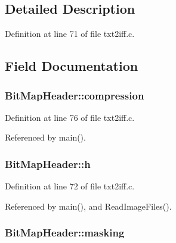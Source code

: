\subsection{Detailed Description}


Definition at line 71 of file txt2iff.\+c.



\subsection{Field Documentation}
\hypertarget{structBitMapHeader_a92825e3c952c151ee3f81630ced3e298}{
\subsubsection[{compression}]{ Bit\+Map\+Header\+::compression}}\label{structBitMapHeader_a92825e3c952c151ee3f81630ced3e298}


Definition at line 76 of file txt2iff.\+c.



Referenced by main().

\hypertarget{structBitMapHeader_a207123a0ebb6f3ac8803fb486184347d}{
\subsubsection[{h}]{ Bit\+Map\+Header\+::h}}\label{structBitMapHeader_a207123a0ebb6f3ac8803fb486184347d}


Definition at line 72 of file txt2iff.\+c.



Referenced by main(), and Read\+Image\+Files().

\hypertarget{structBitMapHeader_a5178ba1e7c3d285038be1436643fc625}{
\subsubsection[{masking}]{ Bit\+Map\+Header\+::masking}}\label{structBitMapHeader_a5178ba1e7c3d285038be1436643fc625}


